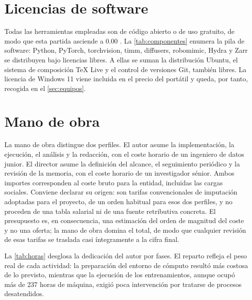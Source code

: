 \section{Licencias de software}
\label{sec:software}

Todas las herramientas empleadas son de c\'odigo abierto o de uso gratuito, de modo que
esta partida asciende a \num{0.00} \texteuro. La \cref{tab:componentes} enumera la pila de
software: Python, PyTorch, torchvision, timm, diffusers, robomimic, Hydra y Zarr se
distribuyen bajo licencias libres. A ellas se suman la distribuci\'on Ubuntu, el sistema
de composici\'on \TeX{} Live y el control de versiones Git, tambi\'en libres. La licencia de
Windows 11 viene incluida en el precio del port\'atil y queda, por tanto, recogida en el
\cref{sec:equipos}.

\section{Mano de obra}
\label{sec:mano-de-obra}

La mano de obra distingue dos perfiles. El autor asume la implementaci\'on, la
ejecuci\'on, el an\'alisis y la redacci\'on, con el coste horario de un ingeniero de datos
junior. El director asume la definici\'on del alcance, el seguimiento peri\'odico y la
revisi\'on de la memoria, con el coste horario de un investigador s\'enior. Ambos importes
corresponden al coste bruto para la entidad, incluidas las cargas sociales. Conviene declarar
su origen: son tarifas convencionales de imputaci\'on adoptadas para el proyecto, de un orden
habitual para esos dos perfiles, y no proceden de una tabla salarial ni de una fuente
retributiva concreta. El
presupuesto es, en consecuencia, una estimaci\'on del orden de magnitud del coste y no una
oferta; la mano de obra domina el total, de modo que cualquier revisi\'on de esas tarifas se
traslada casi \'integramente a la cifra final.

La \cref{tab:horas} desglosa la dedicaci\'on del autor por fases. El reparto refleja el
peso real de cada actividad: la preparaci\'on del entorno de c\'omputo result\'o m\'as
costosa de lo previsto, mientras que la ejecuci\'on de los entrenamientos, aunque ocup\'o
m\'as de \num{237} horas de m\'aquina, exigi\'o poca intervenci\'on por tratarse de procesos
desatendidos.


